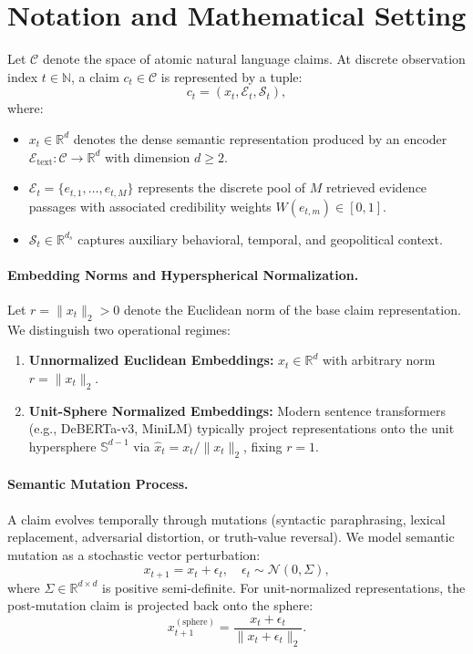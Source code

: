 \section{Notation and Mathematical Setting}
\label{sec:notation}

Let $\mathcal{C}$ denote the space of atomic natural language claims. At discrete observation index $t \in \mathbb{N}$, a claim $c_t \in \mathcal{C}$ is represented by a tuple:
\begin{equation}
c_t = (x_t, \mathcal{E}_t, \mathcal{S}_t),
\end{equation}
where:
\begin{itemize}
    \item $x_t \in \mathbb{R}^d$ denotes the dense semantic representation produced by an encoder $\mathcal{E}_{\text{text}}: \mathcal{C} \to \mathbb{R}^d$ with dimension $d \ge 2$.
    \item $\mathcal{E}_t = \{e_{t,1}, \dots, e_{t,M}\}$ represents the discrete pool of $M$ retrieved evidence passages with associated credibility weights $W(e_{t,m}) \in [0, 1]$.
    \item $\mathcal{S}_t \in \mathbb{R}^{d_s}$ captures auxiliary behavioral, temporal, and geopolitical context.
\end{itemize}

\paragraph{Embedding Norms and Hyperspherical Normalization.}
Let $r = \|x_t\|_2 > 0$ denote the Euclidean norm of the base claim representation. We distinguish two operational regimes:
\begin{enumerate}
    \item \textbf{Unnormalized Euclidean Embeddings:} $x_t \in \mathbb{R}^d$ with arbitrary norm $r = \|x_t\|_2$.
    \item \textbf{Unit-Sphere Normalized Embeddings:} Modern sentence transformers (e.g., DeBERTa-v3, MiniLM) typically project representations onto the unit hypersphere $\mathbb{S}^{d-1}$ via $\hat{x}_t = x_t / \|x_t\|_2$, fixing $r = 1$.
\end{enumerate}

\paragraph{Semantic Mutation Process.}
A claim evolves temporally through mutations (syntactic paraphrasing, lexical replacement, adversarial distortion, or truth-value reversal). We model semantic mutation as a stochastic vector perturbation:
\begin{equation}
x_{t+1} = x_t + \epsilon_t, \quad \epsilon_t \sim \mathcal{N}(0, \Sigma),
\end{equation}
where $\Sigma \in \mathbb{R}^{d \times d}$ is positive semi-definite. For unit-normalized representations, the post-mutation claim is projected back onto the sphere:
\begin{equation}
x_{t+1}^{(\text{sphere})} = \frac{x_t + \epsilon_t}{\|x_t + \epsilon_t\|_2}.
\end{equation}

